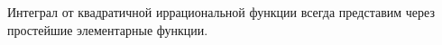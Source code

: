 
 	Интеграл от квадратичной иррациональной функции всегда представим через простейшие элементарные функции.
 